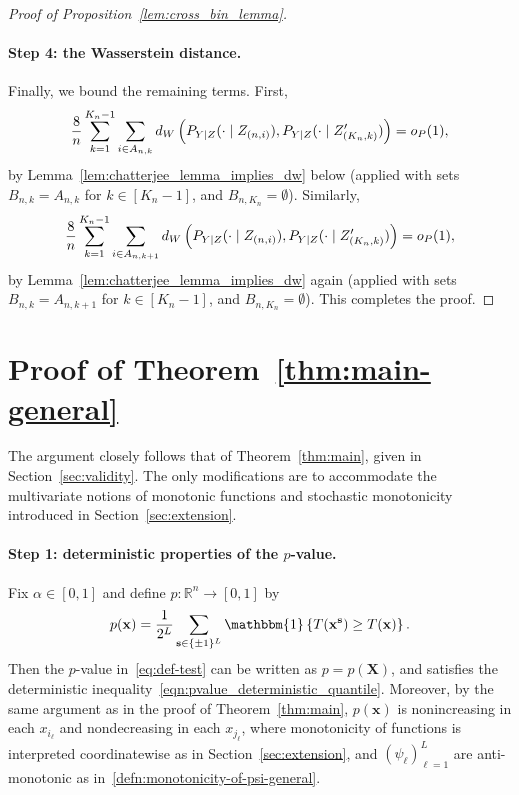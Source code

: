 \documentclass[12pt]{article}
\newcommand{\R}{\mathbb{R}}
\newcommand{\One}[1]{{\mathbbm{1}}\left\{{#1}\right\}}
\newcommand{\bs}{\mathbf{s}}
\newcommand{\bx}{\mathbf{x}}
\newcommand{\bX}{\mathbf{X}}
\begin{document}
\begin{proof}[Proof of Proposition~\ref{lem:cross_bin_lemma}]
\paragraph{Step 4: the Wasserstein distance.}
Finally, we bound the remaining terms. First, 
\[
\frac{8}{n}\sum_{k=1}^{K_n-1}
    \sum_{i\in A_{n,k}}{\rm d}_{\rm W}\left(P_{Y|Z}(\cdot\mid Z_{(n,i)}),P_{Y|Z}(\cdot\mid Z'_{(K_n,k)})\right)={\rm o}_P(1), 
    \]
  by Lemma~\ref{lem:chatterjee_lemma_implies_dw} below (applied with sets $B_{n,k} = A_{n,k}$ for $k \in [K_n-1]$, and $B_{n,K_n} = \emptyset$). Similarly,
 \[
 \frac{8}{n}\sum_{k=1}^{K_n-1}
    \sum_{i\in A_{n,k+1}}{\rm d}_{\rm W}\left(P_{Y|Z}(\cdot\mid Z_{(n,i)}),P_{Y|Z}(\cdot\mid Z'_{(K_n,k)})\right) ={\rm o}_P(1),
    \]
  by Lemma~\ref{lem:chatterjee_lemma_implies_dw} again (applied with sets $B_{n,k} = A_{n,k+1}$ for $k \in [K_n-1]$, and $B_{n,K_n} = \emptyset$).  This completes the proof.
\end{proof}

\section{Proof of Theorem~\ref{thm:main-general}}\label{app:proof_validity_extension}
The argument closely follows that of Theorem~\ref{thm:main}, given in Section~\ref{sec:validity}. The only modifications are to accommodate the multivariate notions of monotonic functions and stochastic monotonicity introduced in Section~\ref{sec:extension}.

\paragraph{Step 1: deterministic properties of the $p$-value.}
Fix $\alpha \in [0,1]$ and define $p:\R^n\to[0,1]$ by
\begin{align*}
    p(\bx) = \frac{1}{2^L}\sum_{\bs\in\{\pm 1\}^L}\One{T(\bx^{\bs})\geq T(\bx)}.
\end{align*}
Then the $p$-value in~\eqref{eq:def-test} can be written as $p=p(\bX)$, and satisfies the deterministic inequality~\eqref{eqn:pvalue_deterministic_quantile}.
Moreover, by the same argument as in the proof of Theorem~\ref{thm:main}, $p(\bx)$ is nonincreasing in each $x_{i_\ell}$ and nondecreasing in each $x_{j_\ell}$, where monotonicity of functions is interpreted coordinatewise as in  Section~\ref{sec:extension}, and $(\psi_\ell)_{\ell=1}^L$ are anti-monotonic as in~\eqref{defn:monotonicity-of-psi-general}.
\end{document}

